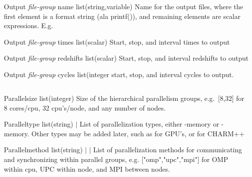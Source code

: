 \documentclass{article}
\begin{document}
\Parameter
{Output}
{\textit{file-group}}
{name}
{list(string,variable)}
{}
{Name for the output files, where the first element is a format string (ala printf()), and remaining elements are scalar expressions. E.g. \code{["wave\_pool-t=\%3.1f.data", t]}}
{}
{}

\Parameter
{Output}
{\textit{file-group}}
{times}
{list(scalar)}
{}
{Start, stop, and interval times to output}
{}
{}

\Parameter
{Output}
{\textit{file-group}}
{redshifts}
{list(scalar)}
{}
{Start, stop, and interval redshifts to output}
{}
{}

\Parameter
{Output}
{\textit{file-group}}
{cycles}
{list(integer}
{}
{start, stop, and interval cycles to output. }
{}
{}

\subsection{}

\Parameter
{Parallel}{}{size}
{list(integer)}{}
{Size of the hierarchical parallelism groups, e.g.~[8,32] for 8 cores/cpu, 32 cpu's/node, and any number of nodes.}
{}
{}

\Parameter
{Parallel}{}{type}
{list(string)}
{ $|$ }
{List of parallelization types, either -memory or -memory. Other types may be added later, such as  for GPU's, or  for CHARM++}
{}
{}

\Parameter
{Parallel}{}{method}
{list(string)}
{ $|$  $|$ }
{List of parallelization methods for communicating and synchronizing within parallel groups, e.g. ["omp","upc","mpi"] for OMP within cpu, UPC within node, and MPI between nodes.}
{}
{}
\end{document}
